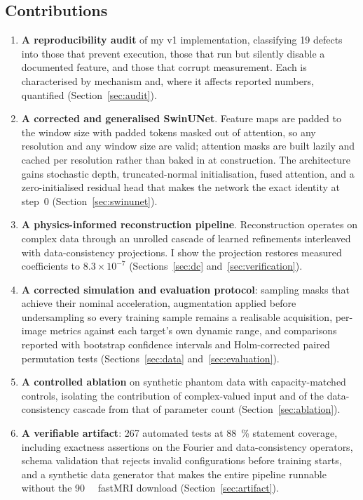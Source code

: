 \documentclass[11pt]{article}
\begin{document}
\subsection{Contributions}

\begin{enumerate}[leftmargin=*]
  \item \textbf{A reproducibility audit} of my v1 implementation,
        classifying 19 defects into those that prevent execution, those that
        run but silently disable a documented feature, and those that corrupt
        measurement. Each is characterised by mechanism and, where it affects
        reported numbers, quantified (Section~\ref{sec:audit}).
  \item \textbf{A corrected and generalised SwinUNet}. Feature maps are padded
        to the window size with padded tokens masked out of attention, so any
        resolution and any window size are valid; attention masks are built
        lazily and cached per resolution rather than baked in at construction.
        The architecture gains stochastic depth, truncated-normal
        initialisation, fused attention, and a zero-initialised residual head
        that makes the network the exact identity at step~0
        (Section~\ref{sec:swinunet}).
  \item \textbf{A physics-informed reconstruction pipeline}. Reconstruction
        operates on complex data through an unrolled cascade of learned
        refinements interleaved with data-consistency projections. I show the
        projection restores measured coefficients to $8.3\times10^{-7}$
        (Sections~\ref{sec:dc} and~\ref{sec:verification}).
  \item \textbf{A corrected simulation and evaluation protocol}: sampling masks
        that achieve their nominal acceleration, augmentation applied before
        undersampling so every training sample remains a realisable
        acquisition, per-image metrics against each target's own dynamic range,
        and comparisons reported with bootstrap confidence intervals and
        Holm-corrected paired permutation tests
        (Sections~\ref{sec:data} and~\ref{sec:evaluation}).
  \item \textbf{A controlled ablation} on synthetic phantom data with
        capacity-matched controls, isolating the contribution of complex-valued
        input and of the data-consistency cascade from that of parameter count
        (Section~\ref{sec:ablation}).
  \item \textbf{A verifiable artifact}: 267 automated tests at \SI{88}{\percent} statement
        coverage, including exactness
        assertions on the Fourier and data-consistency operators, schema
        validation that rejects invalid configurations before training starts,
        and a synthetic data generator that makes the entire pipeline runnable
        without the \SI{90}{\giga\byte} fastMRI download
        (Section~\ref{sec:artifact}).
\end{enumerate}
\end{document}
